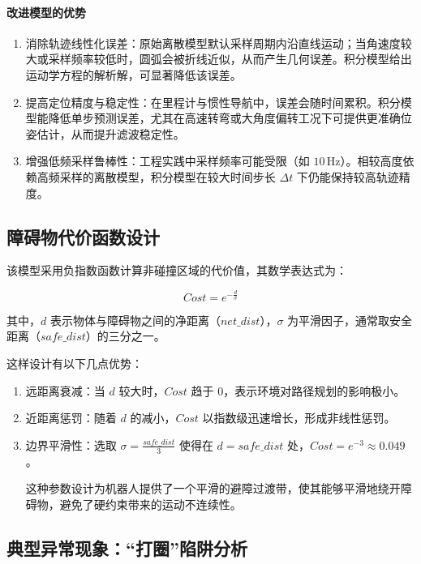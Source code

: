 \paragraph{改进模型的优势}
\begin{enumerate}
    \item 消除轨迹线性化误差：原始离散模型默认采样周期内沿直线运动；当角速度较大或采样频率较低时，圆弧会被折线近似，从而产生几何误差。积分模型给出运动学方程的解析解，可显著降低该误差。
    \item 提高定位精度与稳定性：在里程计与惯性导航中，误差会随时间累积。积分模型能降低单步预测误差，尤其在高速转弯或大角度偏转工况下可提供更准确位姿估计，从而提升滤波稳定性。
    \item 增强低频采样鲁棒性：工程实践中采样频率可能受限（如 $10\,\mathrm{Hz}$）。相较高度依赖高频采样的离散模型，积分模型在较大时间步长 $\Delta t$ 下仍能保持较高轨迹精度。
\end{enumerate}

\subsection{障碍物代价函数设计}

该模型采用负指数函数计算非碰撞区域的代价值，其数学表达式为：

\begin{equation}
Cost = e^{-\frac{d}{\sigma}}
\end{equation}

其中，$d$ 表示物体与障碍物之间的净距离（$net\_dist$），$\sigma$ 为平滑因子，通常取安全距离（$safe\_dist$）的三分之一。

这样设计有以下几点优势：
\begin{enumerate}
    \item 远距离衰减：当 $d$ 较大时，$Cost$ 趋于 $0$，表示环境对路径规划的影响极小。
    \item 近距离惩罚：随着 $d$ 的减小，$Cost$ 以指数级迅速增长，形成非线性惩罚。
    \item 边界平滑性：选取 $\sigma = \frac{safe\_dist}{3}$ 使得在 $d = safe\_dist$ 处，$Cost = e^{-3} \approx 0.049$。
    
    这种参数设计为机器人提供了一个平滑的避障过渡带，使其能够平滑地绕开障碍物，避免了硬约束带来的运动不连续性。
\end{enumerate}

\subsection{典型异常现象：“打圈”陷阱分析}

